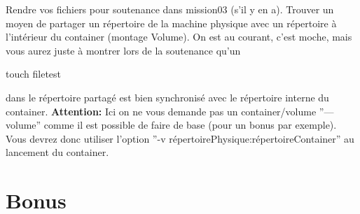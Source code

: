 \documentclass{42}
\begin{document}
Rendre vos fichiers pour soutenance dans mission03 (s’il y en a).
\newline
\newline
Trouver un moyen de partager un répertoire de la machine physique avec un répertoire à l'intérieur du container (montage Volume).
On est au courant, c’est moche, mais vous aurez juste à montrer lors de la soutenance qu’un
\begin{42console}
touch filetest
\end{42console}
dans le répertoire partagé est bien synchronisé avec le répertoire interne du container.
\newline
\newline
\newline
\warn
{
\textbf{Attention:}
\newline
\newline
Ici on ne vous demande pas un container/volume ''---volume'' comme il est possible de faire de base (pour un bonus par exemple).
\newline
\newline
Vous devrez donc utiliser l’option
\newline
''-v répertoirePhysique:répertoireContainer'' au lancement du container.
}

\chapter{Bonus}
\end{document}
